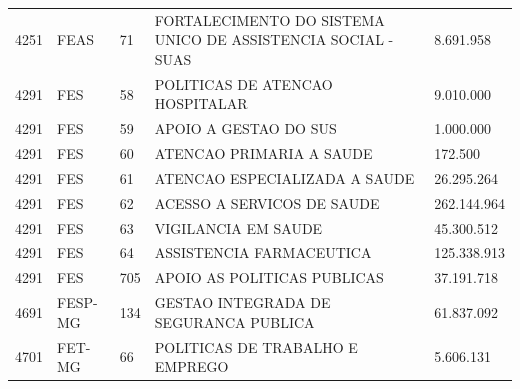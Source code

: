 \documentclass{article}
\begin{document}
\begin{longtable}[c]{m{1cm}|m{1.5cm}|m{1cm}m{10cm}|m{2cm}}
\multicolumn{1}{C{1cm}|}{4251} & \multicolumn{1}{L{1.5cm}|}{FEAS} & \multicolumn{1}{C{1cm}|}{71} & \multicolumn{1}{L{10cm}|}{FORTALECIMENTO DO SISTEMA UNICO DE ASSISTENCIA SOCIAL - SUAS} & \multicolumn{1}{R{2cm}}{8.691.958} \\
\multicolumn{1}{C{1cm}|}{4291} & \multicolumn{1}{L{1.5cm}|}{FES} & \multicolumn{1}{C{1cm}|}{58} & \multicolumn{1}{L{10cm}|}{POLITICAS DE ATENCAO HOSPITALAR} & \multicolumn{1}{R{2cm}}{9.010.000} \\
\multicolumn{1}{C{1cm}|}{4291} & \multicolumn{1}{L{1.5cm}|}{FES} & \multicolumn{1}{C{1cm}|}{59} & \multicolumn{1}{L{10cm}|}{APOIO A GESTAO DO SUS} & \multicolumn{1}{R{2cm}}{1.000.000} \\
\multicolumn{1}{C{1cm}|}{4291} & \multicolumn{1}{L{1.5cm}|}{FES} & \multicolumn{1}{C{1cm}|}{60} & \multicolumn{1}{L{10cm}|}{ATENCAO PRIMARIA A SAUDE} & \multicolumn{1}{R{2cm}}{172.500} \\
\multicolumn{1}{C{1cm}|}{4291} & \multicolumn{1}{L{1.5cm}|}{FES} & \multicolumn{1}{C{1cm}|}{61} & \multicolumn{1}{L{10cm}|}{ATENCAO ESPECIALIZADA A SAUDE} & \multicolumn{1}{R{2cm}}{26.295.264} \\
\multicolumn{1}{C{1cm}|}{4291} & \multicolumn{1}{L{1.5cm}|}{FES} & \multicolumn{1}{C{1cm}|}{62} & \multicolumn{1}{L{10cm}|}{ACESSO A SERVICOS DE SAUDE} & \multicolumn{1}{R{2cm}}{262.144.964} \\
\multicolumn{1}{C{1cm}|}{4291} & \multicolumn{1}{L{1.5cm}|}{FES} & \multicolumn{1}{C{1cm}|}{63} & \multicolumn{1}{L{10cm}|}{VIGILANCIA EM SAUDE} & \multicolumn{1}{R{2cm}}{45.300.512} \\
\multicolumn{1}{C{1cm}|}{4291} & \multicolumn{1}{L{1.5cm}|}{FES} & \multicolumn{1}{C{1cm}|}{64} & \multicolumn{1}{L{10cm}|}{ASSISTENCIA FARMACEUTICA} & \multicolumn{1}{R{2cm}}{125.338.913} \\
\multicolumn{1}{C{1cm}|}{4291} & \multicolumn{1}{L{1.5cm}|}{FES} & \multicolumn{1}{C{1cm}|}{705} & \multicolumn{1}{L{10cm}|}{APOIO AS POLITICAS PUBLICAS} & \multicolumn{1}{R{2cm}}{37.191.718} \\
\multicolumn{1}{C{1cm}|}{4691} & \multicolumn{1}{L{1.5cm}|}{FESP-MG} & \multicolumn{1}{C{1cm}|}{134} & \multicolumn{1}{L{10cm}|}{GESTAO INTEGRADA DE SEGURANCA PUBLICA} & \multicolumn{1}{R{2cm}}{61.837.092} \\
\multicolumn{1}{C{1cm}|}{4701} & \multicolumn{1}{L{1.5cm}|}{FET-MG} & \multicolumn{1}{C{1cm}|}{66} & \multicolumn{1}{L{10cm}|}{POLITICAS DE TRABALHO E EMPREGO} & \multicolumn{1}{R{2cm}}{5.606.131} \\

\end{longtable}
\end{document}
